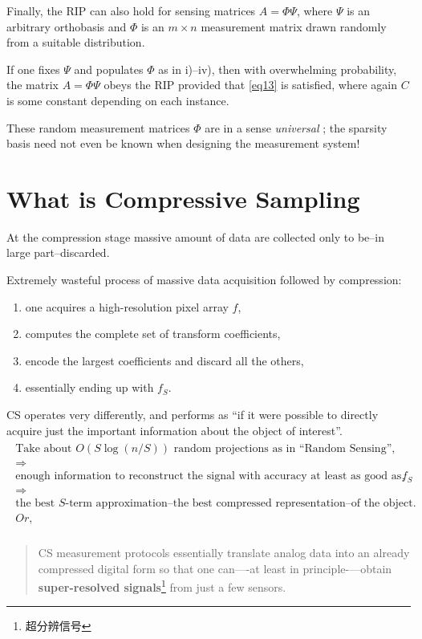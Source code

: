 Finally, the RIP can also hold for sensing matrices $A=\Phi\Psi$, where $\Psi$ is an \textcolor[rgb]{1,0,0}{arbitrary orthobasis }and $\Phi$ is an \textcolor[rgb]{1,0,0}{$m \times n$ measurement matrix drawn randomly from a suitable distribution}.

If one fixes $\Psi$ and populates $\Phi$ as in i)–iv), then with overwhelming probability, the matrix $A=\Phi\Psi$ obeys the RIP provided that \cref{eq13} is satisfied, where again $C$ is some constant depending on each instance.

These random measurement matrices $\Phi$ are in a sense \textcolor[rgb]{1,0,0}{\emph{universal}} \cite{23}; the sparsity basis need not even be known when designing the measurement system!


\section{What is Compressive Sampling}
\label{secwhatiscompressivesampling}
At the compression stage massive amount of data are collected only to be--in large part--discarded.

Extremely wasteful process of massive data acquisition followed by compression:

\begin{enumerate}
	\label{wastefulcompress}
	\item one acquires a high-resolution pixel array $f$,
	\item computes the complete set of transform coefficients,
	\item encode the largest coefficients and discard all the others,
	\item essentially ending up with $f_S$.
\end{enumerate}

CS operates very differently, and performs as ``if it were possible to directly acquire just the important information about the object of interest''.
\begin{eqnarray*}
\begin{gathered}
\mbox{Take about $O(S\log(n/S))$ random projections as in ``Random Sensing''},\\
\Longrightarrow\\
\mbox{enough information to reconstruct the signal with accuracy at least as good as that provided by $f_S$},\\
\Longrightarrow\\
\mbox{the best $S$-term approximation--the best compressed representation--of the object.}\\
Or,
\end{gathered}\\
\end{eqnarray*}
\begin{quote}
	CS measurement protocols essentially translate analog data into an already compressed digital form so that one can—-at least in principle-—obtain \textbf{\textcolor[rgb]{1,0,0}{super-resolved signals}}\footnote{超分辨信号} from just a few sensors. 
\end{quote}

